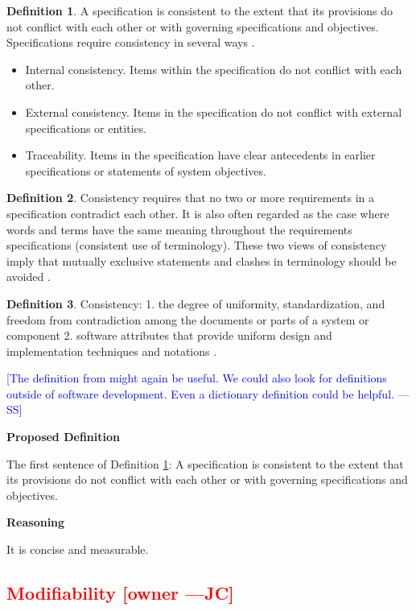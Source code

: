 \documentclass[letterpaper,cleveref]{lipics-v2019}
\newcommand{\authornote}[3]{\textcolor{#1}{[#3 ---#2]}}
\newcommand{\authornote}[3]{}
\newcommand{\wss}[1]{\authornote{blue}{SS}{#1}} %
\newcommand{\jc}[1]{\authornote{red}{JC}{#1}} %
\newcommand{\notdone}[1]{\textcolor{red}{#1}}
\theoremstyle{definition}
\newtheorem{defn}{Definition}
\begin{document}
\begin{defn}
\label{ConsistencySelected}
A specification is consistent to the extent that its provisions do not conflict
with each other or with governing specifications and objectives. Specifications
require consistency in several ways \citep{Boehm1984}.
\begin{itemize}
\item Internal consistency. Items within the specification do not conflict with
each other.
\item External consistency. Items in the specification do not conflict with
external specifications or entities.
\item Traceability. Items in the specification have clear antecedents in earlier
specifications or statements of system objectives.
\end{itemize}
\end{defn}
\begin{defn}
Consistency requires that no two or more requirements in a specification
contradict each other. It is also often regarded as the case where words and
terms have the same meaning throughout the requirements specifications
(consistent use of terminology). These two views of consistency imply that
mutually exclusive statements and clashes in terminology should be avoided
\citep{ZOWGHI2003}.
\end{defn}
\begin{defn}
Consistency: 1. the degree of uniformity, standardization, and freedom from
contradiction among the documents or parts of a system or component 2. software
attributes that provide uniform design and implementation techniques and
notations \citep{ISO/IEC/IEEE24765}.
\end{defn}

\wss{The definition from \citet{IEEE1998} might again be useful.  We could also
  look for definitions outside of software development.  Even a dictionary
  definition could be helpful.}

\noindent \textbf{Proposed Definition} 

The first sentence of Definition \ref{ConsistencySelected}: A specification is
consistent to the extent that its provisions do not conflict with each other or
with governing specifications and objectives.

\noindent \textbf{Reasoning}

It is concise and measurable.

\subsection{\notdone{Modifiability} \jc{owner}}
\end{document}
